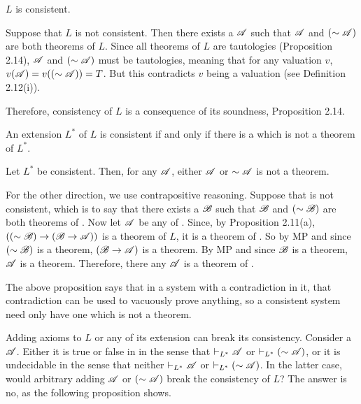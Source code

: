 \begin{proposition}
  \(L\) is consistent.

  \prf{} Suppose that \(L\) is not consistent. Then there exists a \wf{} \(\mathscr{A}\) such that \(\mathscr{A}\) and \((\sim\mathscr{A})\) are both theorems of \(L\). Since all theorems of \(L\) are tautologies (Proposition 2.14), \(\mathscr{A}\) and \((\sim\mathscr{A})\) must be tautologies, meaning that for any valuation \(v\), \(v(\mathscr{A}) = v((\sim\mathscr{A})) = T\). But this contradicts \(v\) being a valuation (see Definition 2.12(i)).

  \note{} Therefore, consistency of \(L\) is a consequence of its soundness, Proposition 2.14.
\end{proposition}

\begin{proposition}
  An extension \(L^{\ast}\) of \(L\) is consistent if and only if there is a \wf{} which is not a theorem of \(L^{\ast}\).

  \prf{} \Ra{} Let \(L^{\ast}\) be consistent. Then, for any \wf{} \(\mathscr{A}\), either \(\mathscr{A}\) or \(\sim\mathscr{A}\) is not a theorem.

  \La{} For the other direction, we use contrapositive reasoning. Suppose that \Lext{} is not consistent, which is to say that there exists a \wf{} \(\mathscr{B}\) such that \(\mathscr{B}\) and \((\sim\mathscr{B})\) are both theorems of \Lext{}. Now let \(\mathscr{A}\) be any \wf{} of \Lext{}. Since, by Proposition 2.11(a), \(((\sim\mathscr{B}) \rightarrow (\mathscr{B} \rightarrow \mathscr{A}))\) is a theorem of \(L\), it is a theorem of \Lext{}. So by MP and since \((\sim\mathscr{B})\) is a theorem, \((\mathscr{B} \rightarrow \mathscr{A})\) is a theorem. By MP and since \(\mathscr{B}\) is a theorem, \(\mathscr{A}\) is a theorem. Therefore, there any \wf{} \(\mathscr{A}\) is a theorem of \Lext.

  \note The above proposition says that in a system with a contradiction in it, that contradiction can be used to vacuously prove anything, so a consistent system need only have one \wf{} which is not a theorem.
\end{proposition}

Adding axioms to \(L\) or any of its extension can break its consistency. Consider a \wf{} \(\mathscr{A}\). Either it is true or false in \Lext{} in the sense that \(\vdash_{L^{\ast}} \mathscr{A}\) or \(\vdash_{L^{\ast}} (\sim\mathscr{A})\), or it is undecidable in the sense that neither \(\vdash_{L^{\ast}} \mathscr{A}\) or \(\vdash_{L^{\ast}} (\sim\mathscr{A})\). In the latter case, would arbitrary adding \(\mathscr{A}\) or \((\sim\mathscr{A})\) break the consistency of \(L\)? The answer is no, as the following proposition shows.

